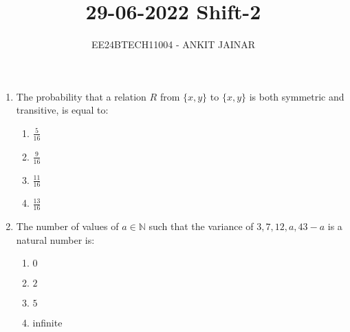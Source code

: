 \documentclass[journal,12pt,onecolumn]{IEEEtran}
\theoremstyle{remark}
\begin{document}

\vspace{3cm}

\title{\textbf{29-06-2022 Shift-2}}
\author{EE24BTECH11004 - ANKIT JAINAR}
\maketitle
\bigskip

\renewcommand{\thefigure}{\theenumi}
\renewcommand{\thetable}{\theenumi}
\setlength{\columnsep}{2.5em}
\begin{enumerate}
\item The probability that a relation $R$ from $\{x, y\}$ to $\{x, y\}$ is both symmetric and transitive, is equal to:
\begin{enumerate}
    \item $\frac{5}{16}$
    \item $\frac{9}{16}$
    \item $\frac{11}{16}$
    \item $\frac{13}{16}$
\end{enumerate}

\item The number of values of $a \in \mathbb{N}$ such that the variance of $3, 7, 12, a, 43 - a$ is a natural number is:
\begin{enumerate}
    \item $0$
    \item $2$
    \item $5$
    \item infinite
\end{enumerate}


\end{enumerate}
\end{document}
